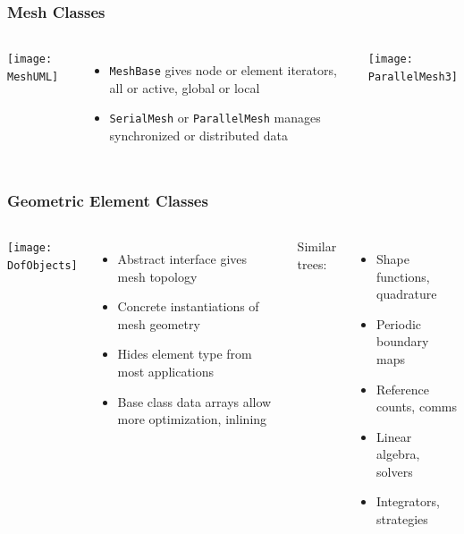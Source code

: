 \documentclass[mathserif]{beamer}
\begin{document}
\begin{frame}
\frametitle{Mesh Classes}
\begin{columns}
\begin{center}
\texttt{[image: MeshUML]}
\end{center}
\begin{itemize}
\item \texttt{MeshBase} gives node or element iterators, all or active, global or local
\item \texttt{SerialMesh} or \texttt{ParallelMesh} manages synchronized or distributed data
\end{itemize}

\texttt{[image: ParallelMesh3]}
\end{columns}

\end{frame}


\begin{frame}
\frametitle{Geometric Element Classes}

\begin{columns}
\begin{center}
\vspace{-5mm}
\texttt{[image: DofObjects]}
\end{center}
\begin{itemize}
\item Abstract interface gives mesh topology
\item Concrete instantiations of mesh geometry
\item Hides element type from most applications
\item Base class data arrays allow more optimization, inlining
\end{itemize}

Similar trees:

\begin{itemize}
\item Shape functions, quadrature
\item Periodic boundary maps
\item Reference counts, comms
\item Linear algebra, solvers
\item Integrators, strategies
\end{itemize}
\end{columns}

\end{frame}
\end{document}
